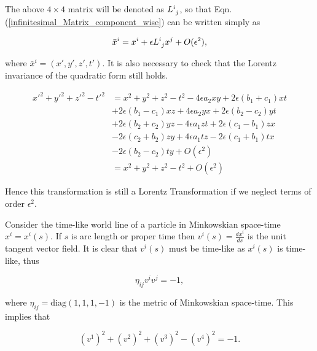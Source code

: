 \noindent The above $4 \times 4$ matrix will be denoted as $\tensor{L}{^i_j}$, so that Eqn.(\ref{infinitesimal_Matrix_component_wise}) can be written simply as 

\begin{equation}\label{Infinitesimal_Infinitesimal_Lorentz_Transformation}
\bar{x}^i = x^i + \epsilon \tensor{L}{^{i}_{j}} x^j + O(\epsilon^2),
\end{equation}

\noindent where $\bar{x}^i = (x',y',z',t')$. It is also necessary to check that the Lorentz invariance of the quadratic form still holds. 

\begin{align*}
{x'}^2 + {y'}^2 + {z'}^2 - {t'}^2 & = x^2 + y^2 + z^2 - t^2 - 4\epsilon a_2 x y + 2 \epsilon(b_1 + c_1)xt \\
                                  & + 2\epsilon (b_1 - c_1)xz + 4 \epsilon a_2 yx + 2\epsilon (b_2 - c_2)yt \\
                                  & + 2 \epsilon (b_2 + c_2)yz - 4\epsilon a_1 zt + 2 \epsilon (c_1 - b_1)zx \\
                                  & -2 \epsilon (c_2 + b_2)zy + 4 \epsilon a_1 tz - 2 \epsilon (c_1 + b_1)tx \\
                                  & -2\epsilon (b_2 - c_2) ty + O(\epsilon^2) \\
                                  & = x^2 + y^2 + z^2 - t^2 + O(\epsilon^2)
\end{align*}

\noindent Hence this transformation is still a Lorentz Transformation if we neglect terms of order $\epsilon^2$.

Consider the time-like world line of a particle in Minkowskian space-time $x^i = x^i(s)$. If $s$ is arc length or proper time then $v^i(s) = \frac{dx^i}{ds}$ is the unit tangent vector field. It is clear that $v^i(s)$ must be time-like as $x^i(s)$ is time-like, thus

\begin{equation*}
\eta_{ij} v^i v^j = -1,
\end{equation*}

\noindent where $\eta_{ij} = \text{diag}(1,1,1,-1)$ is the metric of Minkowskian space-time. This implies that 

\begin{equation*}
(v^1)^2  + (v^2)^2 + (v^3)^2  - (v^4)^2 = -1.
\end{equation*}

